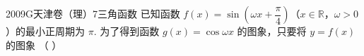 
\begin{problem}{2009}{G}{天津卷（理）}{7}{三角函数}
已知函数 $f(x)=\sin\left(\omega x+\dfrac{\pi}{4}\right)$（$x\in\mathbb{R}$，$\omega>0$）的最小正周期为 $\pi$. 为了得到函数 $g(x)=\cos\omega x$ 的图象，只要将 $y=f(x)$ 的图象 \hspace{1cm} （ ）
\begin{choices}
\end{choices}
\end{problem}

\begin{answer}

\end{answer}

\begin{solutions}

\end{solutions}